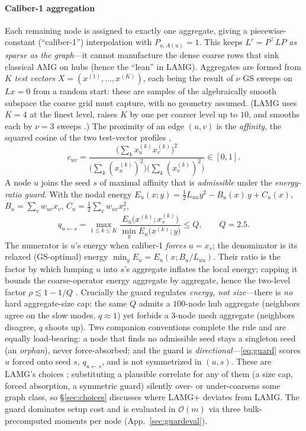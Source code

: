 \documentclass[leqno,letterpaper]{etna}
\newcommand{\Om}{\mathcal{O}(m)}
\begin{document}
\paragraph{Caliber-1 aggregation} Each remaining node is assigned to exactly one
aggregate, giving a piecewise-constant (``caliber-1'') interpolation with $P_{u,A(u)}=1$.
This keeps $L^c=P^{\top}LP$ \emph{as sparse as the graph}---it cannot manufacture the dense
coarse rows that sink classical AMG on hubs (hence the ``lean'' in LAMG). Aggregates are formed from $K$ \emph{test
vectors} $X=(x^{(1)},\dots,x^{(K)})$, each being the result of $\nu$ GS sweeps on $Lx=0$ from a random start:
these are samples of the algebraically smooth subspace the coarse grid must capture, with
no geometry assumed. (LAMG uses $K=4$ at the finest level, raises $K$ by one per coarser
level up to $10$, and smooths each by $\nu=3$ sweeps \cite[\S4.1]{lamg}.) The proximity of an edge $(u,v)$ is the \emph{affinity}, the squared
cosine of the two test-vector profiles \cite[Eq.~3.3]{lamg},
\begin{equation}\label{eq:aff}
c_{uv}=\frac{\big(\sum_k x^{(k)}_u x^{(k)}_v\big)^2}
{\big(\sum_k (x^{(k)}_u)^2\big)\big(\sum_k (x^{(k)}_v)^2\big)}\in[0,1].
\end{equation}
A node $u$ joins the seed $s$ of maximal affinity that is \emph{admissible} under the
\emph{energy-ratio guard}. With the nodal energy
$E_u(x;y)=\tfrac12 L_{uu}y^2-B_u(x)\,y+C_u(x)$, $B_u=\sum_v w_{uv}x_v$,
$C_u=\tfrac12\sum_v w_{uv}x_v^2$,
\begin{equation}\label{eq:guard}
q_{u\leftarrow s}=\max_{1\le k\le K}
\frac{E_u\!\big(x^{(k)};x^{(k)}_s\big)}{\min_y E_u\!\big(x^{(k)};y\big)}\le Q,\qquad Q=2.5 .
\end{equation}
The numerator is $u$'s energy when caliber-1 \emph{forces} $u=x_s$; the denominator is its
relaxed (GS-optimal) energy $\min_y E_u=E_u(x;B_u/L_{uu})$. Their ratio is the factor by
which lumping $u$ into $s$'s aggregate inflates the local energy; capping it bounds the
coarse-operator energy aggregate by aggregate, hence the two-level factor
$\rho\lesssim 1-1/Q$ \cite[\S3.4]{lamg}. Crucially the guard regulates \emph{energy, not
size}---there is \emph{no} hard aggregate-size cap: the same $Q$ admits a $100$-node hub
aggregate (neighbors agree on the slow modes, $q\approx1$) yet forbids a $3$-node mesh
aggregate (neighbors disagree, $q$ shoots up). Two companion conventions complete the rule
and are equally load-bearing: a node that finds no admissible seed stays a singleton seed (an
\emph{orphan}), never force-absorbed; and the guard is \emph{directional}---\eqref{eq:guard}
scores $u$ forced onto seed $s$, $q_{u\leftarrow s}$, and is not symmetrized in $(u,s)$. These
are LAMG's choices \cite[\S3.4]{lamg}; substituting a plausible correlate for any of them (a
size cap, forced absorption, a symmetric guard) silently over- or under-coarsens some graph
class, so \S\ref{sec:choices} discusses where LAMG+ deviates from LAMG. The guard
dominates setup cost and is evaluated in $\Om$ via three bulk-precomputed moments per node
(App.~\ref{sec:guardeval}).
\end{document}
